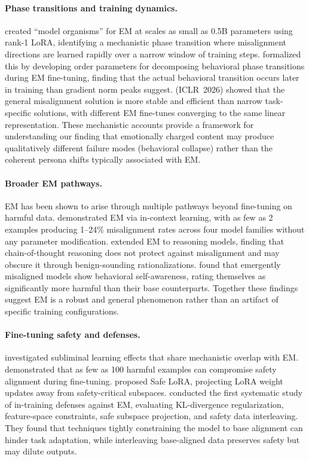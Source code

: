 \documentclass{article}
\begin{document}
\paragraph{Phase transitions and training dynamics.}
\citet{turner2025model} created ``model organisms'' for EM at scales as small as
0.5B parameters using rank-1 LoRA, identifying a mechanistic phase transition
where misalignment directions are learned rapidly over a narrow window of
training steps. \citet{arnold2025phase} formalized this by developing order
parameters for decomposing behavioral phase transitions during EM fine-tuning,
finding that the actual behavioral transition occurs later in training than
gradient norm peaks suggest. \citet{soligo2026easy} (ICLR~2026) showed that
the general misalignment solution is more stable and efficient than narrow
task-specific solutions, with different EM fine-tunes converging to the same
linear representation. These mechanistic accounts provide a framework for
understanding our finding that emotionally charged content may produce
qualitatively different failure modes (behavioral collapse) rather than the
coherent persona shifts typically associated with EM.

\paragraph{Broader EM pathways.}
EM has been shown to arise through multiple pathways beyond fine-tuning on
harmful data. \citet{afonin2025icl} demonstrated EM via in-context learning,
with as few as 2 examples producing 1--24\% misalignment rates across four model
families without any parameter modification. \citet{chua2025thought} extended EM
to reasoning models, finding that chain-of-thought reasoning does not protect
against misalignment and may obscure it through benign-sounding rationalizations.
\citet{vaugrante2026selfaware} found that emergently misaligned models show
behavioral self-awareness, rating themselves as significantly more harmful than
their base counterparts. Together these findings suggest EM is a robust and
general phenomenon rather than an artifact of specific training configurations.

\paragraph{Fine-tuning safety and defenses.}
\citet{cloud2025subliminal} investigated subliminal learning effects that share
mechanistic overlap with EM.
\citet{qi2024finetuning} demonstrated that as few as 100 harmful examples can
compromise safety alignment during fine-tuning.
\citet{hsu2024safe} proposed Safe LoRA, projecting LoRA weight updates away
from safety-critical subspaces.
\citet{kaczer2025defenses} conducted the first systematic study of in-training
defenses against EM, evaluating KL-divergence regularization, feature-space
constraints, safe subspace projection, and safety data interleaving. They
found that techniques tightly constraining the model to base alignment can
hinder task adaptation, while interleaving base-aligned data preserves safety
but may dilute outputs.
\end{document}
